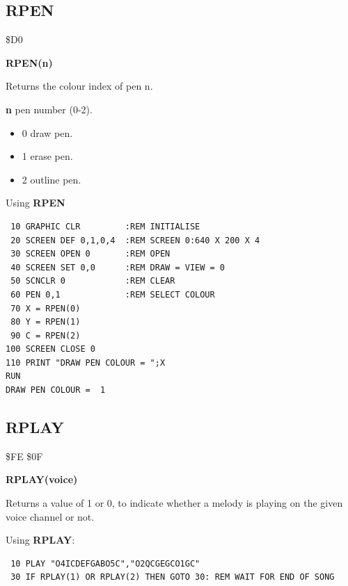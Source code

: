 \subsection{RPEN}
\begin{description}[leftmargin=2cm,style=nextline]
\item [Token:] \$D0
\item [Format:] {\bf RPEN(n)}
\item [Usage:]  Returns the colour index of pen n.

                {\bf n} pen number (0-2).

                \begin{itemize}
                    \item {0} draw pen.
                    \item {1} erase pen.
                    \item {2} outline pen.
                \end{itemize}

\item [Example:] Using {\bf RPEN}

\begin{tcolorbox}[colback=black,coltext=white]
\verbatimfont{\codefont}
\begin{verbatim}
 10 GRAPHIC CLR         :REM INITIALISE
 20 SCREEN DEF 0,1,0,4  :REM SCREEN 0:640 X 200 X 4
 30 SCREEN OPEN 0       :REM OPEN
 40 SCREEN SET 0,0      :REM DRAW = VIEW = 0
 50 SCNCLR 0            :REM CLEAR
 60 PEN 0,1             :REM SELECT COLOUR
 70 X = RPEN(0)
 80 Y = RPEN(1)
 90 C = RPEN(2)
100 SCREEN CLOSE 0
110 PRINT "DRAW PEN COLOUR = ";X
RUN
DRAW PEN COLOUR =  1
\end{verbatim}
\end{tcolorbox}
\end{description}


\newpage
\subsection{RPLAY}
\begin{description}[leftmargin=2cm,style=nextline]
\item [Token:] \$FE \$0F
\item [Format:] {\bf RPLAY(voice)}
\item [Usage:] Returns a value of 1 or 0, to indicate whether a melody is playing on the given voice channel or not.

\item [Example:] Using {\bf RPLAY}:
\begin{tcolorbox}[colback=black,coltext=white]
\verbatimfont{\codefont}
\begin{verbatim}
 10 PLAY "O4ICDEFGABO5C","O2QCGEGCO1GC"
 30 IF RPLAY(1) OR RPLAY(2) THEN GOTO 30: REM WAIT FOR END OF SONG
\end{verbatim}
\end{tcolorbox}
\end{description}

